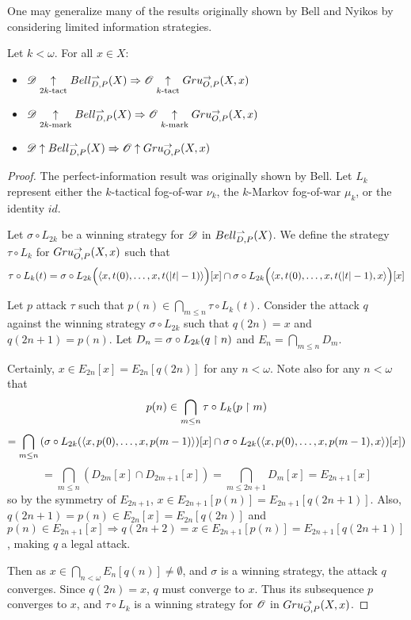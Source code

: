 One may generalize many of the results originally shown by Bell \cite{MR3239205}
and Nyikos \cite{nyikosProximalPreprint} by considering limited information
strategies.

\begin{thm}
Let $k<\omega$. For all $x\in X$:
  \begin{itemize}
    \item
      $
        \mathscr{D}\underset{2k\text{-tact}}{\uparrow} Bell_{D,P}^{\rightharpoonup}(X)
          \Rightarrow
        \mathscr{O} \underset{k\text{-tact}}{\uparrow} Gru_{O,P}^{\to}(X,x)
      $
    \item
      $
        \mathscr{D}\underset{2k\text{-mark}}{\uparrow} Bell_{D,P}^{\rightharpoonup}(X)
          \Rightarrow
        \mathscr{O} \underset{k\text{-mark}}{\uparrow} Gru_{O,P}^{\to}(X,x)
      $
    \item
      $
        \mathscr{D}\uparrow Bell_{D,P}^{\rightharpoonup}(X)
          \Rightarrow
        \mathscr{O} \uparrow Gru_{O,P}^{\to}(X,x)
      $
  \end{itemize}
\end{thm}

\begin{proof}
The perfect-information result was originally shown by Bell.
Let $L_k$ represent either the $k$-tactical fog-of-war $\nu_k$,
the $k$-Markov fog-of-war $\mu_k$, or the identity $id$.

Let $\sigma\circ L_{2k}$ be a winning strategy for $\mathscr{D}$ in $Bell_{D,P}^{\rightharpoonup}(X)$.
We define the strategy $\tau\circ L_k$ for $Gru_{O,P}^{\to}(X,x)$ such that
  \[
    \tau\circ {L}_k(t)
      =
    \sigma\circ {L}_{2k} \Big(\langle x,t(0),\dots,x,t(|t|-1)\rangle\Big)[x]
      \cap
    \sigma\circ {L}_{2k} \Big(\langle x,t(0),\dots,x,t(|t|-1),x\rangle\Big)[x]
  \]

Let $p$ attack $\tau$ such that $p(n)\in\bigcap_{m\leq n}\tau\circ L_k(t)$.
Consider the attack $q$ against the winning strategy
$\sigma\circ {L}_{2k}$ such that $q(2n)=x$ and $q(2n+1)=p(n)$.
Let $D_n=\sigma\circ {L}_{2k}(q\restriction n)$ and $E_n=\bigcap_{m\leq n}D_m$.

Certainly, $x\in E_{2n}[x]= E_{2n}[q(2n)]$ for any $n<\omega$.
Note also for any $n<\omega$ that
    \[
      p(n) \in
      \bigcap_{m\leq n}\tau\circ {L}_k(p\restriction m)
    \]
    \[
      =
      \bigcap_{m\leq n}\left(
        \sigma\circ {L}_{2k}(\langle x,p(0),\dots,x,p(m-1)\rangle)[x]\cap
        \sigma\circ {L}_{2k}(\langle x,p(0),\dots,x,p(m-1),x\rangle)[x]
      \right)
    \]
    \[
      =
      \bigcap_{m\leq n}\left(
        D_{2m}[x]\cap
        D_{2m+1}[x]
      \right) =
      \bigcap_{m\leq 2n+1} D_m[x]=E_{2n+1}[x]
    \]
so by the symmetry of $E_{2n+1}$, $x\in E_{2n+1}[p(n)]= E_{2n+1}[q(2n+1)]$.
Also, $q(2n+1)=p(n)\in E_{2n}[x]=E_{2n}[q(2n)]$ and
$p(n)\in E_{2n+1}[x] \Rightarrow q(2n+2)=x\in E_{2n+1}[p(n)]=E_{2n+1}[q(2n+1)]$,
making $q$ a legal attack.

Then as $x\in \bigcap_{n<\omega} E_n[q(n)]\not=\emptyset$, and $\sigma$ is
a winning strategy, the attack $q$ converges. Since $q(2n)=x$, $q$ must
converge to $x$. Thus its subsequence $p$ converges to $x$, and $\tau\circ L_k$
is a winning strategy for $\mathscr{O}$ in $Gru_{O,P}^{\to}(X,x)$.
\end{proof}

